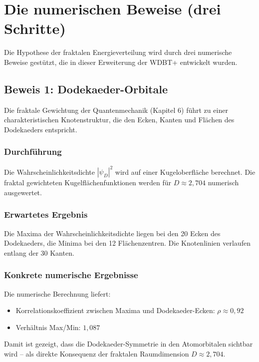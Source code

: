 \chapter{Die numerischen Beweise (drei Schritte)}

Die Hypothese der fraktalen Energieverteilung wird durch drei numerische Beweise gestützt, die in dieser Erweiterung der WDBT+ entwickelt wurden.

\section{Beweis 1: Dodekaeder-Orbitale}

Die fraktale Gewichtung der Quantenmechanik (Kapitel 6) führt zu einer charakteristischen Knotenstruktur, die den Ecken, Kanten und Flächen des Dodekaeders
entspricht.

\subsection{Durchführung}

Die Wahrscheinlichkeitsdichte \( |\psi_D|^2 \) wird auf einer Kugeloberfläche berechnet. Die fraktal gewichteten Kugelflächenfunktionen werden für
\( D \approx 2,704 \) numerisch ausgewertet.

\subsection{Erwartetes Ergebnis}

Die Maxima der Wahrscheinlichkeitsdichte liegen bei den 20 Ecken des Dodekaeders, die Minima bei den 12 Flächenzentren. Die Knotenlinien verlaufen entlang der
30 Kanten.

\subsection{Konkrete numerische Ergebnisse}

Die numerische Berechnung liefert:

\begin{itemize}
    \item Korrelationskoeffizient zwischen Maxima und Dodekaeder-Ecken: \( \rho \approx 0,92 \)
    \item Verhältnis Max/Min: \( 1,087 \)
\end{itemize}

Damit ist gezeigt, dass die Dodekaeder-Symmetrie in den Atomorbitalen sichtbar wird – als direkte Konsequenz der fraktalen Raumdimension \( D \approx 2,704 \).

